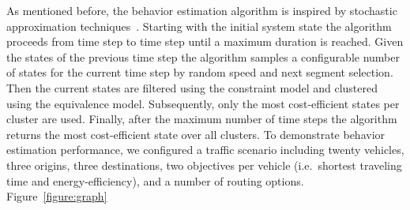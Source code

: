 \documentclass[conference]{../cls/IEEEtran}
\begin{document}
As mentioned before, the behavior estimation algorithm is inspired by stochastic approximation techniques~\cite{Pereira1991}. Starting with the initial system state the algorithm proceeds from time step to time step until a maximum duration is reached. Given the states of the previous time step the algorithm samples a configurable number of states for the current time step by random speed and next segment selection. Then the current states are filtered using the constraint model and clustered using the equivalence model. Subsequently, only the most cost-efficient states per cluster are used. Finally, after the maximum number of time steps the algorithm returns the most cost-efficient state over all clusters. To demonstrate behavior estimation performance, we configured a traffic scenario including twenty vehicles, three origins, three destinations, two objectives per vehicle (i.e.\ shortest traveling time and energy-efficiency), and a number of routing options. Figure~\ref{figure:graph} 

\end{document}
